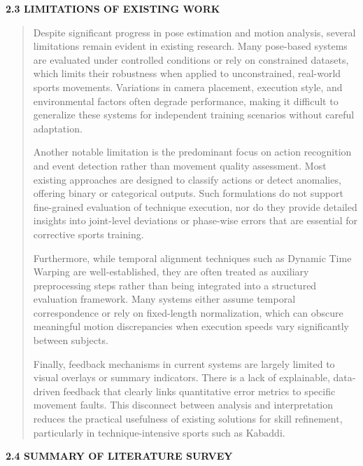 \documentclass[
]{article}
\begin{document}
\textbf{2.3 LIMITATIONS OF EXISTING WORK}

\begin{quote}
Despite significant progress in pose estimation and motion analysis,
several limitations remain evident in existing research. Many pose-based
systems are evaluated under controlled conditions or rely on constrained
datasets, which limits their robustness when applied to unconstrained,
real-world sports movements. Variations in camera placement, execution
style, and environmental factors often degrade performance, making it
difficult to generalize these systems for independent training scenarios
without careful adaptation.

Another notable limitation is the predominant focus on action
recognition and event detection rather than movement quality assessment.
Most existing approaches are designed to classify actions or detect
anomalies, offering binary or categorical outputs. Such formulations do
not support fine-grained evaluation of technique execution, nor do they
provide detailed insights into joint-level deviations or phase-wise
errors that are essential for corrective sports training.

Furthermore, while temporal alignment techniques such as Dynamic Time
Warping are well-established, they are often treated as auxiliary
preprocessing steps rather than being integrated into a structured
evaluation framework. Many systems either assume temporal correspondence
or rely on fixed-length normalization, which can obscure meaningful
motion discrepancies when execution speeds vary significantly between
subjects.

Finally, feedback mechanisms in current systems are largely limited to
visual overlays or summary indicators. There is a lack of explainable,
data-driven feedback that clearly links quantitative error metrics to
specific movement faults. This disconnect between analysis and
interpretation reduces the practical usefulness of existing solutions
for skill refinement, particularly in technique-intensive sports such as
Kabaddi.
\end{quote}

\textbf{2.4 SUMMARY OF LITERATURE SURVEY}
\end{document}
